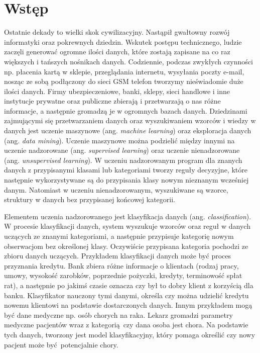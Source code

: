 \chapter*{Wstęp}
Ostatnie dekady to wielki skok cywilizacyjny. Nastąpił gwałtowny rozwój informatyki oraz pokrewnych dziedzin. Wskutek postępu technicznego, ludzie zaczęli generować ogromne ilości danych, które zostają zapisane na co raz większych i tańszych nośnikach danych. Codziennie, podczas zwykłych czynności np. płacenia kartą w sklepie, przeglądania internetu, wysyłania poczty e-mail, nosząc ze sobą podłączony do sieci GSM telefon tworzymy nieświadomie duże ilości danych. Firmy ubezpieczeniowe, banki, sklepy, sieci handlowe i inne instytucje prywatne oraz publiczne zbierają i przetwarzają o nas różne informacje, a następnie gromadzą je w ogromnych bazach danych. Dziedzinami zajmującymi się przetwarzaniem danych oraz wyszukiwaniem wzorców i wiedzy w danych jest uczenie maszynowe (ang. \textit{machine learning}) oraz eksploracja danych (ang. \textit{data mining}). Uczenie maszynowe można podzielić między innymi na uczenie nadzorowane (ang. \textit{supervised learning}) oraz uczenie nienadzorowane (ang. \textit{unsupervised learning}). W uczeniu nadzorowanym program dla znanych danych z przypisanymi klasami lub kategoriami tworzy reguły decyzyjne, które następnie wykorzystywane są do przypisania klasy nowym nieznanym wcześniej danym. Natomiast w uczeniu nienadzorowanym, wyszukiwane są wzorce, struktury w danych bez przypisanej końcowej kategorii. \par 
Elementem uczenia nadzorowanego jest klasyfikacja danych (ang. \textit{classification}). W procesie klasyfikacji danych, system wyszukuje wzorców oraz reguł w danych uczących ze znanymi kategoriami, a następnie przypisuje kategorię nowym obserwacjom bez określonej klasy. Oczywiście przypisana kategoria pochodzi ze zbioru danych uczących. Przykładem klasyfikacji danych może być proces przyznania kredytu. Bank zbiera różne informacje o klientach (rodzaj pracy, umowy, wysokość zarobków, poprzednie pożyczki, kredyty, terminowość spłat rat), a następnie po jakimś czasie oznacza czy był to dobry klient z korzyścią dla banku. Klasyfikator nauczony tymi danymi, określa czy można udzielić kredytu nowemu klientowi na podstawie dostarczonych danych. Innym przykładem mogą być dane medyczne np. osób chorych na raka. Lekarz gromadzi parametry medyczne pacjentów wraz z kategorią czy dana osoba jest chora. Na podstawie tych danych, tworzony jest model klasyfikacyjny, który pomaga określić czy nowy pacjent może być potencjalnie chory.\par 
